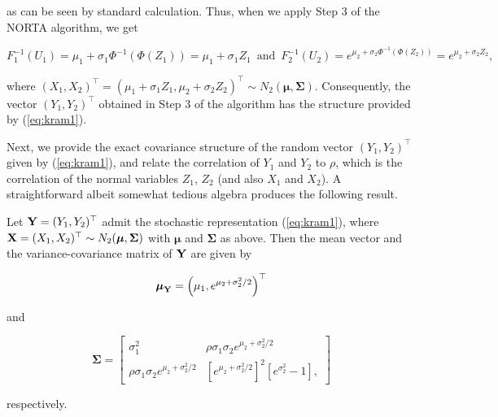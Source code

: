 \documentclass[
]{jss}
\begin{document}
as can be seen by standard calculation. Thus, when we apply Step 3 of
the NORTA algorithm, we get

\begin{equation}
\label{eq:kram5}
F_1^{-1}(U_1) = \mu_1+\sigma_1 \Phi^{-1}(\Phi(Z_1)) =  \mu_1+\sigma_1 Z_1 \,\,\, \mbox{and} \,\,\, F_2^{-1}(U_2) = e^{\mu_2+\sigma_2 \Phi^{-1}(\Phi(Z_2))} = e^{\mu_2+\sigma_2 Z_2}, 
\end{equation}

where
\((X_1, X_2)^\top = (\mu_1+\sigma_1 Z_1, \mu_2+\sigma_2 Z_2)^\top \sim N_2(\boldsymbol \mu, \boldsymbol \Sigma)\).
Consequently, the vector \((Y_1, Y_2)^\top\) obtained in Step 3 of the
algorithm has the structure provided by (\ref{eq:kram1}).

\vspace{0.1in}

\noindent Next, we provide the exact covariance structure of the random
vector \((Y_1, Y_2)^\top\) given by (\ref{eq:kram1}), and relate the
correlation of \(Y_1\) and \(Y_2\) to \(\rho\), which is the correlation
of the normal variables \(Z_1\), \(Z_2\) (and also \(X_1\) and \(X_2\)).
A straightforward albeit somewhat tedious algebra produces the following
result.

\begin{lemma}
Let ${\bf Y} = (Y_1, Y_2)^\top$ admit the stochastic representation (\ref{eq:kram1}), where ${\bf X} = (X_1, X_2)^\top \sim N_2(\boldsymbol \mu, \boldsymbol \Sigma)$ with $\boldsymbol \mu$ and $\boldsymbol \Sigma$ as above. Then the mean vector and the variance-covariance matrix of ${\bf Y}$ are given by 

\begin{equation}
\label{eq:kram6}
\boldsymbol \mu_{{\bf Y}} = \left(\mu_1, e^{\mu_2+\sigma_2^2/2}\right)^\top
\end{equation}

and 

\begin{equation}
\label{eq:kram7}
\boldsymbol \Sigma = 
\begin{bmatrix}
\sigma_1^2 & \rho \sigma_1\sigma_2  e^{\mu_2+\sigma_2^2/2}  \\
\rho \sigma_1\sigma_2 e^{\mu_2+\sigma_2^2/2} & \left[ e^{\mu_2+\sigma_2^2/2}\right]^2 \left[e^{\sigma_2^2} -1 \right],
\end{bmatrix}
\end{equation}

respectively. 
\end{lemma}
\end{document}
